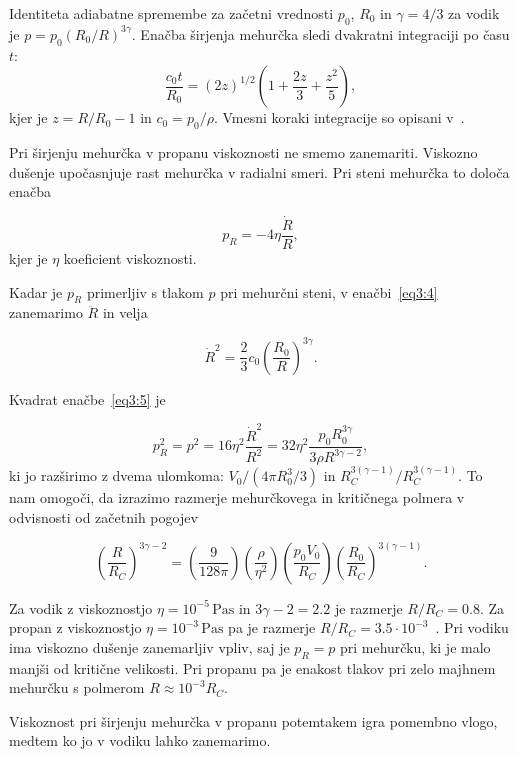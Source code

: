 Identiteta adiabatne spremembe za začetni vrednosti \( p_0 \), \( R_0 \) in \( \gamma = 4 / 3 \) za vodik je \( p = p_0 {\left( R_0 /R \right)}^{3 \gamma} \). Enačba širjenja mehurčka sledi dvakratni integraciji po času \( t \):
\[  \frac{c_0 t}{R_0} = {\left( 2 z \right)}^{1/2} \left( 1 + \frac{2z}{3} + \frac{z ^2}{5} \right),
\]
kjer je \( z = R/ R_0 - 1 \) in \( c_0 = p_0 / \rho \). Vmesni koraki integracije so opisani v~\cite{lamb_xxiii_1923}.

Pri širjenju mehurčka v propanu viskoznosti ne smemo zanemariti. Viskozno dušenje upočasnjuje rast mehurčka v radialni smeri. Pri steni mehurčka to določa enačba

\begin{equation}
\label{eq3:5}
p_R = - 4 \eta \frac{\dot{R}}{R},
\end{equation}
kjer je \( \eta \) koeficient viskoznosti.

Kadar je \( p_R \) primerljiv s tlakom \( p \) pri mehurčni steni, v enačbi~\eqref{eq3:4} zanemarimo \( \ddot{R} \) in velja

\[  \dot{R} ^2 = \frac{2}{3} c_0 {\left( \frac{R_0}{R} \right)}^{3\gamma}.
\]

Kvadrat enačbe~\eqref{eq3:5} je

\[  p_R ^2 = p ^2 = 16 \eta ^2 \frac{\dot{R} ^2}{R ^2} = 32 \eta ^2 \frac{p_0 R_0 ^{3\gamma}}{3 \rho R ^{3 \gamma - 2}},
\]
ki jo razširimo z dvema ulomkoma: \( V_0 / \left( 4 \pi R_0 ^3 / 3 \right) \) in \( R_C^{3(\gamma - 1)}/ R_C^{3(\gamma - 1)} \). To nam omogoči, da izrazimo razmerje mehurčkovega in kritičnega polmera v odvisnosti od začetnih pogojev

\[  {\left( \frac{R}{R_C} \right)}^{3\gamma - 2} = \left( \frac{9}{128 \pi} \right) \left( \frac{\rho}{\eta ^2} \right) \left( \frac{p_0 V_0}{R_C} \right) {\left( \frac{R_0}{R_C} \right)}^{3(\gamma - 1)}.
\]

Za vodik z viskoznostjo \( \eta = 10^{-5}\, \mathrm{Pa}\mathrm{s} \) in \( 3 \gamma - 2 = 2.2 \) je razmerje \( R / R_C = 0.8 \). Za propan z viskoznostjo \( \eta = 10^{-3}\, \mathrm{Pa} \mathrm{s} \) pa je razmerje \( R/ R_C = 3.5 \cdot 10^{-3} \)~\cite{seitz_theory_1958}. Pri vodiku ima viskozno dušenje zanemarljiv vpliv, saj je \( p_R = p \) pri mehurčku, ki je malo manjši od kritične velikosti. Pri propanu pa je enakost tlakov pri zelo majhnem mehurčku s polmerom \( R \approx 10^{-3} R_C \).

Viskoznost pri širjenju mehurčka v propanu potemtakem igra pomembno vlogo, medtem ko jo v vodiku lahko zanemarimo.


